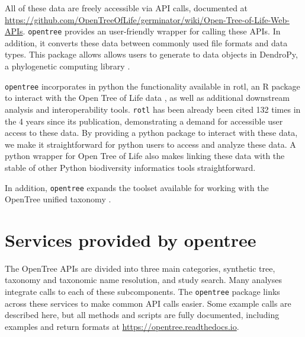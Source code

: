 \documentclass[oupdraft]{sysbio_sse}
\begin{document}
All of these data are freely accessible via API calls, documented at \url{https://github.com/OpenTreeOfLife/germinator/wiki/Open-Tree-of-Life-Web-APIs}.
\texttt{opentree}  provides an user-friendly wrapper for calling these APIs.
In addition, it converts these data between commonly used file formats and data types.
This package allows allows users to generate to data objects in DendroPy, a phylogenetic computing library \citep{sukumaran_dendropy_2010}.


\texttt{opentree} incorporates in python the functionality available in rotl, an {R} package to interact with the Open Tree of Life data \citep{michonneau_rotl_2016}, as well as additional downstream analysis and interoperability tools.
\texttt{rotl} has been already been cited 132 times in the 4 years since its publication, demonstrating a demand for accessible user access to these data.
By providing a python package to interact with these data, we make it straightforward for python users to access and analyze these data.
A python wrapper for Open Tree of Life also makes linking these data with the stable of other Python biodiversity informatics tools straightforward.

In addition, \texttt{opentree} expands the toolset available for working with the OpenTree unified taxonomy \citep{rees_automated_2017}.


\bigskip
\section{Services provided by opentree}
\label{sec3}


The OpenTree APIs are divided into three main categories, synthetic tree,  taxonomy and taxonomic name resolution, and study search.
Many analyses integrate calls to each of these subcomponents. 
The \texttt{opentree} package links across these services to make common API calls easier.
Some example calls are described here, but all methods and scripts are fully documented, including examples and return formats at \url{https://opentree.readthedocs.io}.
\end{document}
